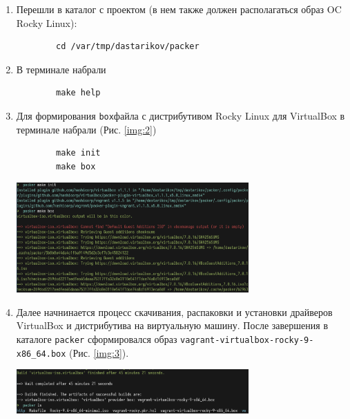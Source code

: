 \begin{enumerate}
    \item Перешли в каталог с проектом (в нем также должен располагаться образ OC Rocky Linux):
        \begin{verbatim}
        cd /var/tmp/dastarikov/packer
        \end{verbatim}
    \item В терминале набрали
        \begin{verbatim}
        makе help
        \end{verbatim}
    \item Для формирования \texttt{box}\-файла с дистрибутивом Rocky Linux для VirtualBox в терминале набрали (Рис. \ref{img:2})
        \begin{verbatim}
        make init
        make box
        \end{verbatim}
    \begin{center}
        \centering
        \includegraphics[width=0.7\textwidth]{../images/img2.png}
        \label{img:2}
    \end{center}

    \item Далее начнинается процесс скачивания, распаковки и установки драйверов VirtualBox и дистрибутива на виртуальную машину. После завершения в каталоге \texttt{packer} сформировался образ \texttt{vagrant-virtualbox-rocky-9-x86\_64.box} (Рис. \ref{img:3}).
    \begin{center}
        \centering
        \includegraphics[width=0.7\textwidth]{../images/img3.png}
        \label{img:3}
    \end{center}


\end{enumerate}
